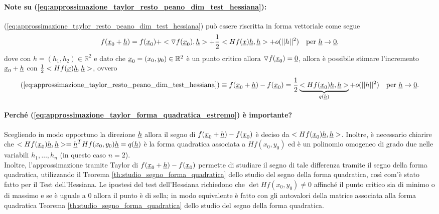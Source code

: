 \paragraph{Note su (\ref{eq:approssimazione_taylor_resto_peano_dim_test_hessiana}):} (\ref{eq:approssimazione_taylor_resto_peano_dim_test_hessiana}) può essere riscritta in forma vettoriale come segue
\begin{equation*}
	f(\uline x_0 +\uline h) = f(\uline x_0) + <\triangledown f(\uline x_0), \uline h> + \frac{1}{2} <Hf(\uline x)\uline h, \uline h> + o(||h||^2)\quad \text{per }\uline h\rightarrow\uline 0,
\end{equation*}
dove con $h=(h_1, h_2)\in\mathbb{R}^2$ e dato che $\uline x_0 = (x_0,y_0)\in\mathbb{R}^2$ è un punto critico allora $\triangledown f(\uline x_0)=\uline 0$, allora è possibile stimare l'incremento $\uline x_0 + \uline h$ con $\frac{1}{2}<Hf(\uline x)\uline h, \uline h>$, ovvero
\begin{equation}\label{eq:approssimazione_taylor_forma_quadratica_estremo}
	(\ref{eq:approssimazione_taylor_resto_peano_dim_test_hessiana})\equiv f(\uline x_0 + \uline h) - f(\uline x_0) = \frac{1}{2}\underbrace{<Hf(\uline x_0)\uline h, \uline h>}_{q(\uline h)} + o(||h||^2)\quad \text{per }\uline h\rightarrow\uline 0.
\end{equation}

\paragraph{Perché (\ref{eq:approssimazione_taylor_forma_quadratica_estremo}) è importante?} Scegliendo in modo opportuno la direzione $\uline h$ allora il segno di $f(\uline x_0 + \uline h) - f(\uline x_0)$ è deciso da $<Hf(\uline x_0)\uline h, \uline h>$. Inoltre, è necessario chiarire che $<Hf(\uline x_0)\uline h, \uline h> = \uline h^T Hf(x_0,y_0)\uline h = q(\uline h)$ è la forma quadratica associata a $Hf(x_0,y_0)$ ed è un polinomio omogeneo di grado due nelle variabili $h_1,\hdots, h_n$ (in questo caso $n=2$).\\
Inoltre, l'approssimazione tramite Taylor di $f(\uline x_0 + \uline h) - f(\uline x_0)$ permette di studiare il segno di tale differenza tramite il segno della forma quadratica, utilizzando il Teorema \ref{th:studio_segno_forma_quadratica} dello studio del segno della forma quadratica, così com'è stato fatto per il Test dell'Hessiana. Le ipostesi del test dell'Hessiana richiedono che $\det Hf(x_0, y_0)\neq 0$ affinché il punto critico sia di minimo o di massimo e se è uguale a 0 allora il punto è di sella; in modo equivalente è fatto con gli autovalori della matrice associata alla forma quadratica Teorema \ref{th:studio_segno_forma_quadratica} dello studio del segno della forma quadratica.

